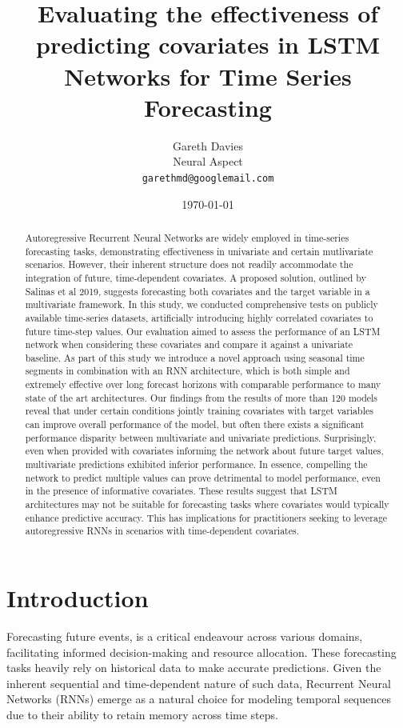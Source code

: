 \documentclass[letterpaper]{article}
\title{Evaluating the effectiveness of predicting covariates in LSTM Networks for Time Series Forecasting}
\author{Gareth Davies\\
Neural Aspect \\
\texttt{garethmd@googlemail.com} }
\date{\today}
\begin{document}
\maketitle

\begin{abstract}
Autoregressive Recurrent Neural Networks are widely employed in time-series forecasting tasks, 
demonstrating effectiveness in univariate and certain mutlivariate scenarios. However, their inherent structure
does not readily accommodate the integration of future, time-dependent covariates. A proposed solution, outlined by 
Salinas et al 2019\cite{salinas2019deepar}, suggests forecasting both covariates and the target variable 
in a multivariate framework. In this study, we conducted comprehensive tests on publicly available time-series datasets, artificially 
introducing highly correlated covariates to future time-step values. Our evaluation aimed to assess the 
performance of an LSTM network when considering these covariates and compare it against a univariate baseline. As part of this study we 
introduce a novel approach using seasonal time segments in combination with an RNN architecture, which is 
both simple and extremely effective over long forecast horizons with comparable performance 
to many state of the art architectures. Our findings from the results of more than 120 models reveal that under certain conditions 
jointly training covariates with target variables can improve overall performance of the model, but often there exists a significant performance 
disparity between multivariate and univariate predictions. Surprisingly, even when provided with covariates informing the 
network about future target values, multivariate predictions exhibited inferior performance. 
In essence, compelling the network to predict multiple values can prove detrimental to model performance, even in the presence of informative covariates.
These results suggest that LSTM architectures may not be suitable for forecasting tasks where covariates 
would typically enhance predictive accuracy. This has implications for practitioners seeking to leverage 
autoregressive RNNs in scenarios with time-dependent covariates.
\end{abstract}

\section{Introduction}
Forecasting future events, is a critical endeavour across various domains, facilitating informed decision-making
and resource allocation. These forecasting tasks heavily rely on historical data to make accurate predictions. Given the inherent 
sequential and time-dependent nature of such data, Recurrent Neural Networks (RNNs) 
\cite{elman1990} emerge as a natural choice for modeling temporal sequences 
due to their ability to retain memory across time steps.
\end{document}
